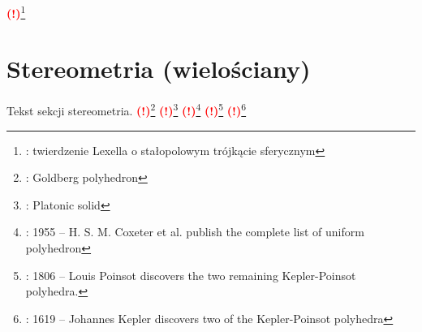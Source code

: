 \documentclass{greaseproof}
\newcommand{\todofoot}[1]{\textcolor{red}{\textbf{(!)}\footnote{\textbf{\color{red}{Do zrobienia}}: #1}}}
\begin{document}
\todofoot{twierdzenie Lexella o stałopolowym trójkącie sferycznym}

\chapter{Stereometria (wielościany)}
Tekst sekcji stereometria.
\todofoot{Goldberg polyhedron} %
\todofoot{Platonic solid} %
\todofoot{1955 – H. S. M. Coxeter et al. publish the complete list of uniform polyhedron}
\todofoot{1806 – Louis Poinsot discovers the two remaining Kepler-Poinsot polyhedra.}
\todofoot{1619 – Johannes Kepler discovers two of the Kepler-Poinsot polyhedra}
\end{document}
